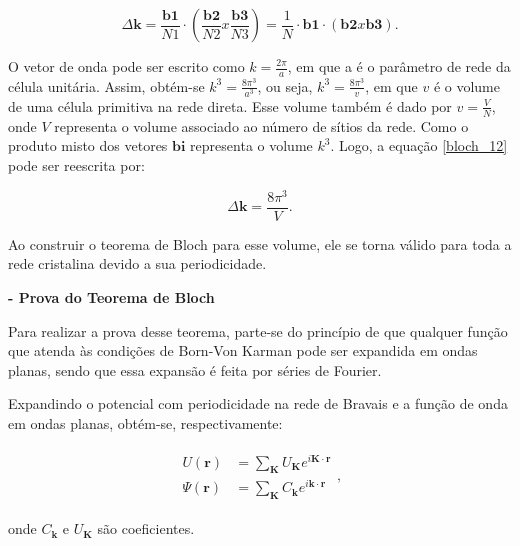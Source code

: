 		\begin{equation}
			\label{bloch_12}
			\Delta \mathbf{k} = \frac{\mathbf{b1}}{N1} \cdot \left( \frac{\mathbf{b2}}{N2} x \frac{\mathbf{b3}}{N3} \right)
				= \frac{1}{N} \cdot \mathbf{b1} \cdot \left(\mathbf{b2} x \mathbf{b3}\right).
		\end{equation}

		\par O vetor de onda pode ser escrito como $k=\frac{2\pi}{a}$, em que a é o parâmetro de rede da célula unitária. Assim, obtém-se $k^3=\frac{8\pi^3}{a^3}$, ou seja, $k^3=\frac{8\pi^3}{v}$, em que $v$ é o volume de uma célula primitiva na rede direta. Esse volume também é dado por $v=\frac{V}{N}$, onde $V$ representa o volume associado ao número de sítios da rede. Como o produto misto dos vetores $\mathbf{bi}$ representa o volume $k^3$. Logo, a equação \eqref{bloch_12} pode ser reescrita por:

		\begin{equation}
			\label{bloch_13}
			\Delta \mathbf{k} = \frac{8\pi^3}{V}.
		\end{equation}

		\par Ao construir o teorema de Bloch para esse volume, ele se torna válido para toda a rede cristalina devido a sua periodicidade.

	\par \textbf{- Prova do Teorema de Bloch}

	\par Para realizar a prova desse teorema, parte-se do princípio de que qualquer função que atenda às condições de Born-Von Karman pode ser expandida em ondas planas, sendo que essa expansão é feita por séries de Fourier. 
	
	\par Expandindo o potencial com periodicidade na rede de Bravais e a função de onda em ondas planas, obtém-se, respectivamente: 

	\begin{align}\label{bloch_14}
	      \begin{array}{ll}
	        \displaystyle U(\mathbf{r}) &= \sum_{\mathbf{K}} U_{\mathbf{K}} e^{i\mathbf{K}\cdot \mathbf{r}}\\
	        \displaystyle \Psi(\mathbf{r}) &= \sum_{\mathbf{K}} C_{\mathbf{k}} e^{i\mathbf{k}\cdot \mathbf{r}}	            
	      \end{array}
	      ,
  \end{align}

	onde $C_{\textbf{k}}$ e $U_{\textbf{K}}$ são coeficientes.

